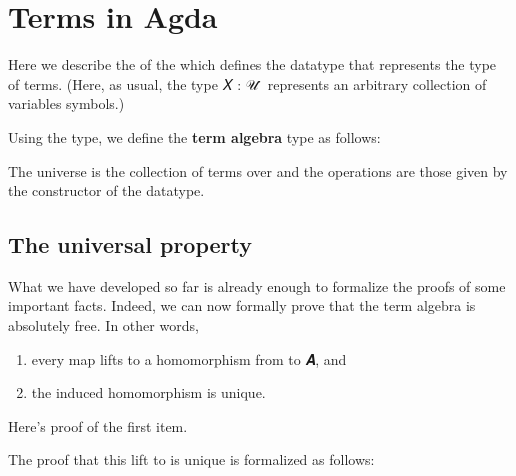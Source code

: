 \documentclass[a4paper,USenglish,cleveref,autoref,thm-restate]{lipics-v2019}
\begin{document}

\section{Terms in Agda}\label{sec:terms-in-agda}
Here we describe the \termsmodule of the \agdaualib which defines the  datatype that represents the type of terms. (Here, as usual, the type \ab 𝑋 : \ab 𝒰 ̇ represents an arbitrary collection of variables symbols.)\\[-5mm]
\begin{code}\end{code}
Using the  type, we define the \textbf{term algebra} type as follows:
\begin{code}\end{code}
The universe is the collection of terms over  and the operations are those given by the  constructor of the  datatype.

\subsection{The universal property}\label{sec:the-universal-property}
What we have developed so far is already enough to formalize the proofs of some important facts. Indeed, we can now formally prove that the term algebra \AgdaSymbol{(}\AgdaSymbol{)} is absolutely free.  In other words,
\begin{enumerate}
\item every map \AgdaSpace{}%
\AgdaSymbol{:}\AgdaSpace{}%
\AgdaSpace{}%
\AgdaSpace{}%
\AgdaSpace{}%
\AgdaSpace{}%
 lifts to a homomorphism from \TX to \AB 𝑨, and
\item the induced homomorphism is unique.
\end{enumerate}
Here's proof of the first item. %
\begin{code}\end{code}
The proof that this lift to \AgdaSymbol{(}\AgdaSymbol{)}\AgdaSpace{}%
\AgdaSpace{} is unique is formalized as follows:
\begin{code}\end{code}
\end{document}
